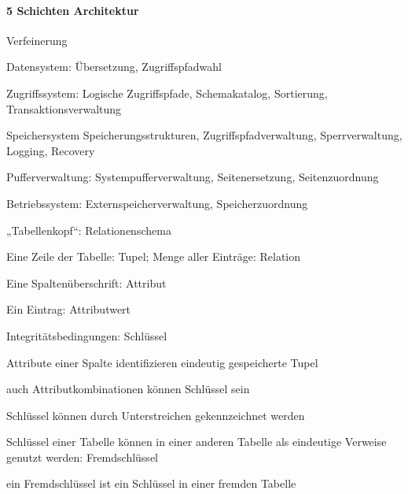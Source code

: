 \documentclass[a4paper]{article}
\begin{document}
\begin{multicols}{3}
    \paragraph{5 Schichten Architektur}
    Verfeinerung
    \begin{itemize*}
        \item Datensystem: Übersetzung, Zugriffspfadwahl
        \item Zugriffssystem: Logische Zugriffspfade, Schemakatalog, Sortierung, Transaktionsverwaltung
        \item Speichersystem Speicherungsstrukturen, Zugriffspfadverwaltung, Sperrverwaltung, Logging, Recovery
        \item Pufferverwaltung: Systempufferverwaltung, Seitenersetzung, Seitenzuordnung
        \item Betriebssystem: Externspeicherverwaltung, Speicherzuordnung
    \end{itemize*}

    \begin{itemize*}
        \item „Tabellenkopf“: Relationenschema
        \item Eine Zeile der Tabelle: Tupel; Menge aller Einträge: Relation
        \item Eine Spaltenüberschrift: Attribut
        \item Ein Eintrag: Attributwert
    \end{itemize*}

    Integritätsbedingungen: Schlüssel
    \begin{itemize*}
        \item Attribute einer Spalte identifizieren eindeutig gespeicherte Tupel
        \item auch Attributkombinationen können Schlüssel sein
        \item Schlüssel können durch Unterstreichen gekennzeichnet werden
        \item Schlüssel einer Tabelle können in einer anderen Tabelle als eindeutige Verweise genutzt werden: Fremdschlüssel
        \item ein Fremdschlüssel ist ein Schlüssel in einer fremden Tabelle
    \end{itemize*}


\end{multicols}
\end{document}
